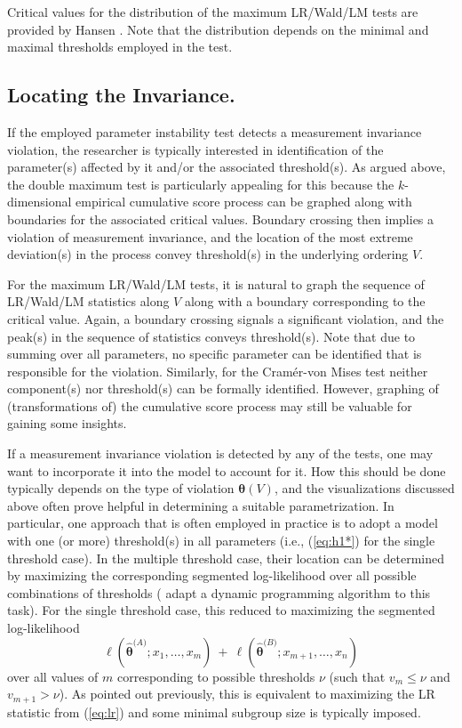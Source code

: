 \documentclass[man]{apa}
\begin{document}
Critical values for the distribution of the maximum LR/Wald/LM tests
are provided by Hansen \citeyear{Han97}. Note that the distribution depends on
the minimal and maximal thresholds employed in the test.


\subsection{Locating the Invariance.}

If the employed parameter instability test detects a measurement invariance violation,
the researcher is typically interested in identification of the parameter(s) affected
by it and/or the associated threshold(s). As argued above, the double maximum test
is particularly appealing for this because the $k$-dimensional empirical cumulative
score process can be graphed along with boundaries for the associated critical values.
Boundary crossing then implies a violation of measurement invariance, and the location of
the most extreme deviation(s) in the process convey threshold(s) in the underlying
ordering $V$.

For the maximum LR/Wald/LM tests, it is natural to graph the sequence of LR/Wald/LM
statistics along $V$ along with a boundary corresponding to the critical value.
Again, a boundary crossing signals a significant violation, and the peak(s) in the
sequence of statistics conveys threshold(s). Note that due to summing over all
parameters, no specific parameter can be identified that is responsible for the
violation. Similarly, for the Cram\'{e}r-von Mises test neither component(s) nor threshold(s)
can be formally identified. However, graphing of (transformations of) the cumulative
score process may still be valuable for gaining some insights.

If a measurement invariance violation is detected by any of the tests,
one may want to incorporate it into the model to account for it. How this should
be done typically depends on the type of violation ${\bm \theta}(V)$, and the visualizations
discussed above often prove helpful in determining a suitable parametrization.
In particular, one approach that is often employed in practice is to adopt a model
with one (or more) threshold(s) in all parameters (i.e., (\ref{eq:h1*}) for the
single threshold case). In the multiple threshold case, their location can
be determined by maximizing the corresponding segmented log-likelihood over all
possible combinations of thresholds ( adapt a dynamic programming
algorithm to this task). For the single threshold case, this reduced to
maximizing the segmented log-likelihood
\begin{equation} \label{eq:seglik}
  \ell(\hat {\bm \theta}^{({A)}}; x_1, \dots, x_m) ~+~ \ell(\hat {\bm \theta}^{({B)}}; x_{m+1}, \dots, x_n)
\end{equation}
over all values of $m$ corresponding to possible thresholds $\nu$ (such that $v_m \le \nu$ and
$v_{m+1} > \nu$). As pointed out previously, this is equivalent to maximizing the LR statistic
from (\ref{eq:lr}) and some minimal subgroup size is typically imposed.
\end{document}
